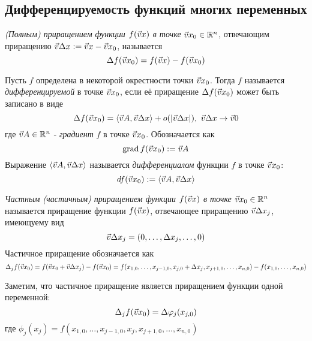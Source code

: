 \begin{multicols}{2}
    \subsection*{Дифференцируемость функций многих переменных}

    \begin{definition}{}{}
        \textit{(Полным) приращением функции $f(\vec{v}{x})$ в точке} $\vec{v}{x}_0 \in \mathbb{R}^n$, отвечающим приращению $\vec{v}{\Delta x} := \vec{v}{x} - \vec{v}{x_0}$, называется
        \[
            \Delta f(\vec{v}{x}_0) = f(\vec{v}{x}) - f(\vec{v}{x}_0)
        \]
    \end{definition}
    
    \begin{definition}{}{}
        Пусть $f$ определена в некоторой окрестности точки $\vec{v}{x}_0$. Тогда $f$ называется \textit{дифференцируемой} в точке $\vec{v}{x}_0$, если её приращение $\Delta f(\vec{v}{x}_0)$ может быть записано в виде
        \[
            \Delta f(\vec{v}{x}_0) = \left\langle\vec{v}{A}, \vec{v}{\Delta x}\right\rangle + o(|\vec{v}{\Delta x}|),\ \vec{v}{\Delta x} \to \vec{v}{0}
        \]
        где $\vec{v}{A} \in \mathbb{R}^n$ - \textit{градиент} $f$ в точке $\vec{v}{x}_0$. Обозначается как
        \[
            \operatorname{grad} f(\vec{v}{x}_0) := \vec{v}{A}
        \]
        Выражение $\left\langle\vec{v}{A}, \vec{v}{\Delta x}\right\rangle$ называется \textit{дифференциалом} функции $f$ в точке $\vec{v}{x}_0$:
        \[
            df(\vec{v}{x}_0) := \left\langle\vec{v}{A}, \vec{v}{\Delta x}\right\rangle
        \]
    \end{definition}
    
    \begin{definition}{}{}
        \textit{Частным (частичным) приращением функции $f(\vec{v}{x})$ в точке} $\vec{v}{x}_0 \in \mathbb{R}^n$ называется приращение функции $f(\vec{v}{x})$, отвечающее 	приращению $\vec{v}{\Delta x}_j$, имеющуему вид
        \[
            \vec{v}{\Delta x}_j = (0, \ldots, \Delta x_j, \ldots, 0)
        \]
        Частичное приращение обозначается как
        \[
            \Delta_j f(\vec{v}{x}_0) = f(\vec{v}{x}_0 + \vec{v}{\Delta x_j}) - f(\vec{v}{x}_0) = f(x_{1, 0}, \ldots, x_{j - 1, 0}, x_{j, 0} + \Delta x_j, x_{j + 1, 0}, \ldots, x_{n, 0}) - f(x_{1, 0}, \ldots, x_{n, 0})
        \]
    \end{definition}
    
    \begin{note}{}{}
        Заметим, что частичное приращение является приращением функции одной переменной:
        \[
            \Delta_j f(\vec{v}{x}_0) = \Delta \varphi_j (x_{j, 0})
        \]
        где $\phi_j(x_j) = f(x_{1, 0}, \ldots, x_{j - 1, 0}, x_j, x_{j + 1, 0}, \ldots, x_{n, 0})$
    \end{note}
    

\end{multicols}
